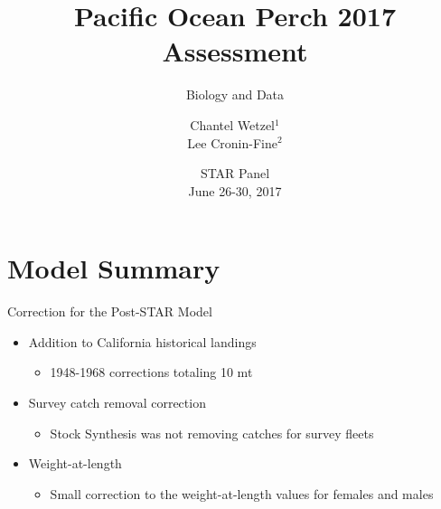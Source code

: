 \documentclass[pdf]{beamer}\usepackage[]{graphicx}\usepackage[]{color}
\title{Pacific Ocean Perch 2017 Assessment}
\subtitle{Biology and Data}
\author{Chantel Wetzel$^{1}$\\
        Lee Cronin-Fine$^{2}$}
\institute[NWFSC]{
Northwest Fisheries Science Center$^1$ \\
University of Washington$^2$ \\
\medskip
}
\date{{\footnotesize STAR Panel \\ June 26-30, 2017}}
\begin{document}
\begin{frame}
  \titlepage
\end{frame}


\section{Model Summary}
\begin{frame}{Correction for the Post-STAR Model}
  \begin{itemize}
    \item Addition to California historical landings
      \begin{itemize}
        \item 1948-1968 corrections totaling 10 mt 
      \end{itemize}
    \item Survey catch removal correction
      \begin{itemize}
        \item Stock Synthesis was not removing catches for survey fleets
      \end{itemize}
    \item Weight-at-length
      \begin{itemize}
        \item Small correction to the weight-at-length values for females and males
      \end{itemize}    
  \end{itemize}
\end{frame}
\end{document}

